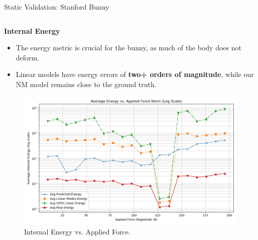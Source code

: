 \documentclass{beamer}
\begin{document}
\begin{frame}{Static Validation: Stanford Bunny}
\begin{columns}[T]
        \begin{column}{0.5\textwidth}
            \textbf{Internal Energy}
            \begin{itemize}
                \item The energy metric is crucial for the bunny, as much of the body does not deform.
                \item Linear models have energy errors of \textbf{two+ orders of magnitude}, while our NM model remains close to the ground truth.
            \end{itemize} 
            \begin{figure}
                \includegraphics[width=\textwidth]{Images/bunny_static_energy.png}
                \caption{Internal Energy vs. Applied Force.}
            \end{figure}
        \end{column}
    \end{columns}
\end{frame}
\end{document}

